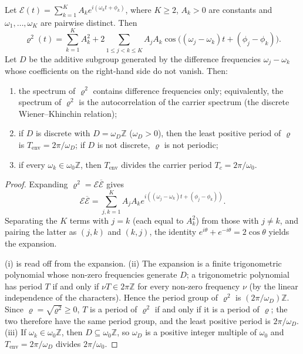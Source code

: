 \begin{theorem}\label{thm:dyn_envelope_difference}
Let $\mathcal E(t)=\sum_{k=1}^{K}A_ke^{i(\omega_kt+\phi_k)}$, where $K\ge2$, $A_k>0$ are constants and $\omega_1,\dots,\omega_K$ are pairwise distinct. Then
\[
\varrho^2(t)=\sum_{k=1}^{K}A_k^2+2\sum_{1\le j<k\le K}A_jA_k\cos\bigl((\omega_j-\omega_k)t+(\phi_j-\phi_k)\bigr).
\]
Let $D$ be the additive subgroup generated by the difference frequencies $\omega_j-\omega_k$ whose coefficients on the right-hand side do not vanish. Then:
\begin{enumerate}[label=(\roman*)]
    \item the spectrum of $\varrho^2$ contains difference frequencies only; equivalently, the spectrum of $\varrho^2$ is the autocorrelation of the carrier spectrum (the discrete Wiener--Khinchin relation);
    \item if $D$ is discrete with $D=\omega_D\mathbb Z$ ($\omega_D>0$), then the least positive period of $\varrho$ is $T_{\text{env}}=2\pi/\omega_D$; if $D$ is not discrete, $\varrho$ is not periodic;
    \item if every $\omega_k\in\omega_0\mathbb Z$, then $T_{\text{env}}$ divides the carrier period $T_c=2\pi/\omega_0$.
\end{enumerate}
\end{theorem}

\begin{proof}
Expanding $\varrho^2=\mathcal E\overline{\mathcal E}$ gives
\[
\mathcal E\overline{\mathcal E}=\sum_{j,k=1}^{K}A_jA_k e^{i((\omega_j-\omega_k)t+(\phi_j-\phi_k))}.
\]
Separating the $K$ terms with $j=k$ (each equal to $A_k^2$) from those with $j\ne k$, and pairing the latter as $(j,k)$ and $(k,j)$, the identity $e^{i\theta}+e^{-i\theta}=2\cos\theta$ yields the expansion.

(i) is read off from the expansion. (ii) The expansion is a finite trigonometric polynomial whose non-zero frequencies generate $D$; a trigonometric polynomial has period $T$ if and only if $\nu T\in2\pi\mathbb Z$ for every non-zero frequency $\nu$ (by the linear independence of the characters). Hence the period group of $\varrho^2$ is $(2\pi/\omega_D)\mathbb Z$. Since $\varrho=\sqrt{\varrho^2}\ge0$, $T$ is a period of $\varrho^2$ if and only if it is a period of $\varrho$; the two therefore have the same period group, and the least positive period is $2\pi/\omega_D$. (iii) If $\omega_k\in\omega_0\mathbb Z$, then $D\subseteq\omega_0\mathbb Z$, so $\omega_D$ is a positive integer multiple of $\omega_0$ and $T_{\text{env}}=2\pi/\omega_D$ divides $2\pi/\omega_0$.
\end{proof}

